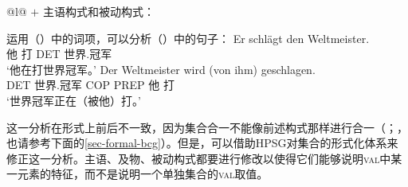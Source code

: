 \ex
\label{ex-schlagen-passive}
\begin{tabular}[t]{@{}l@{}}
 $+$ 主语构式和被动构式：\\
\end{tabular}
\zl
运用（）中的词项，可以分析（）中的句子：
\eal
\label{ex-cxg-weltmeister}
\ex 
\gll Er schlägt den Weltmeister.\\
	 他 打 DET 世界.冠军\\
\glt `他在打世界冠军。'
\ex 
\gll Der Weltmeister wird (von ihm) geschlagen.\\
	 DET 世界.冠军 COP \spacebr{}PREP 他 打\\
\glt `世界冠军正在（被他）打。'
\zl

\noindent
这一分析在形式上前后不一致，因为集合合一不能像前述构式那样进行合一（\citealp{Mueller2006d}；\citealp[\S~7.5.2]{MuellerLehrbuch1}，也请参考下面的\ref{sec-formal-bcg}）。但是，可以借助HPSG对集合的形式化体系来修正这一分析\citep{ps,PM90a}。主语、及物、被动构式都要进行修改以使得它们能够说明\textsc{val}中某一元素的特征，而不是说明一个单独集合的\textsc{val}取值。

